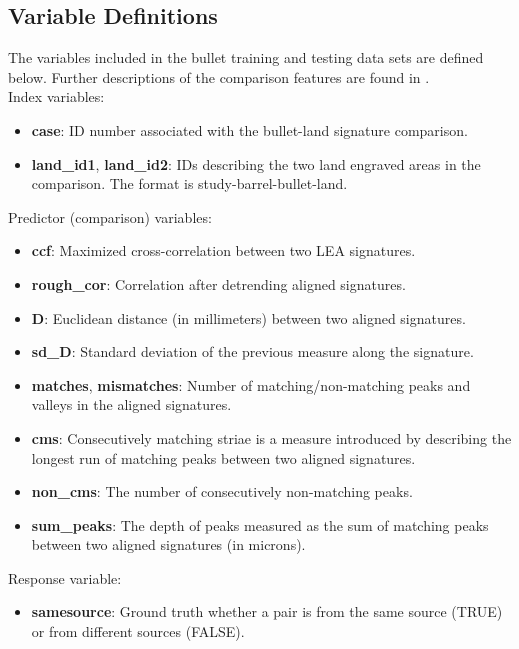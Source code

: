 \documentclass{article}\usepackage[]{graphicx}\usepackage[]{color}
\begin{document}
\subsection{Variable Definitions}

The variables included in the bullet training and testing data sets are defined below. Further descriptions of the comparison features are found in \citet{hare:2017}.\\

\noindent Index variables:

\begin{itemize}
\item \textbf{case}: ID number associated with the bullet-land signature comparison.
\item \textbf{land\_id1}, \textbf{land\_id2}: IDs describing the two land engraved areas in the comparison. The format is study-barrel-bullet-land.
\end{itemize}

\noindent Predictor (comparison) variables:

\begin{itemize}
\item \textbf{ccf}: Maximized cross-correlation between two LEA signatures.
\item \textbf{rough\_cor}: Correlation after detrending aligned signatures.
\item \textbf{D}: Euclidean distance (in millimeters) between two aligned signatures.
\item \textbf{sd\_D}: Standard deviation of the previous measure along the signature.
\item \textbf{matches}, \textbf{mismatches}: Number of matching/non-matching peaks and valleys in the aligned signatures.
\item \textbf{cms}: Consecutively matching striae is a measure introduced by \citet{biasotti:1959} describing the longest run of matching peaks between two aligned signatures.
\item \textbf{non\_cms}: The number of consecutively non-matching peaks.
\item \textbf{sum\_peaks}: The depth of peaks measured as the sum of matching peaks between two aligned signatures (in microns).
\end{itemize}

\noindent Response variable:

\begin{itemize}
\item \textbf{samesource}: Ground truth whether a pair is from the same source (TRUE) or from different sources (FALSE).
\end{itemize}
\end{document}
